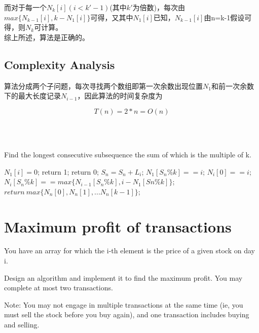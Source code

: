 \documentclass{article}
\begin{document}
\begin{CJK*}{UTF8}{gbsn}
而对于每一个$N_{k}[i](i<k'-1)$(其中$k'$为倍数)，每次由$max\{N_{k-1}[i],k-N_1[i]\}$可得，又其中$N_1[i]$已知，$N_{k-1}[i]$由n=k-1假设可得，则$N_{k}$可计算。
\\

综上所述，算法是正确的。

\subsection{Complexity Analysis}
算法分成两个子问题，每次寻找两个数组即第一次余数出现位置$N_1$和前一次余数下的最大长度记录$N_{i-1}$，因此算法的时间复杂度为

\begin{equation} 
T(n)=2*n=O(n)
\end{equation} 

\quad\\\\

\begin{algorithm}[htbp]  
  \caption{Find the longest consecutive subsequence the sum of which is the multiple of k.}  
  \begin{algorithmic}[1] 
	\State $N_1[i]=0$;
     \EndFor
	\State return 1;
	\EndIf
	\State return 0;
	\EndIf
	\State$S_n = S_n + L_i$;
	\State $N_1[S_n\%k] ==i$;
	\Else
	\State$N_i[0]==i$;
	\Else
	\State$N_i[S_n\%k]==max\{N_{i-1}[S_n\%k],i-N_1[Sn\%k]\}$;
	\EndIf
	\EndIf
	\EndFor
	\State$return\ max\{N_n[0], N_n[1],...N_n[k-1]\}$;
    \EndFunction  
  \end{algorithmic}  
\end{algorithm} 

\newpage
\section{Maximum profit of transactions}
You have an array for which the i-th element is the price of a given stock on day i.

Design an algorithm and implement it to find the maximum profit. You may complete at most two transactions.

Note: You may not engage in multiple transactions at the same time (ie, you must sell the stock before you buy again), and one transaction includes buying and selling.




\end{CJK*}
\end{document}
